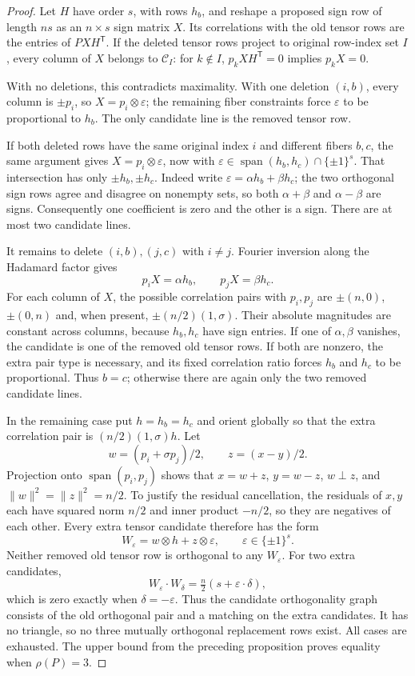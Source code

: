 \begin{proof}
Let $H$ have order $s$, with rows $h_b$, and reshape a proposed sign
row of length $ns$ as an $n\times s$ sign matrix $X$. Its correlations
with the old tensor rows are the entries of $PXH^{\mathsf T}$.
If the deleted tensor rows project to original row-index set $I$,
every column of $X$ belongs to $\mathcal C_I$: for $k\notin I$,
$p_kXH^{\mathsf T}=0$ implies $p_kX=0$.

With no deletions, this contradicts maximality. With one deletion
$(i,b)$, every column is $\pm p_i$, so $X=p_i\otimes\varepsilon$;
the remaining fiber constraints force $\varepsilon$ to be proportional
to $h_b$. The only candidate line is the removed tensor row.

If both deleted rows have the same original index $i$ and different
fibers $b,c$, the same argument gives $X=p_i\otimes\varepsilon$, now
with $\varepsilon\in\operatorname{span}(h_b,h_c)\cap\{\pm1\}^s$.
That intersection has only $\pm h_b,\pm h_c$. Indeed write
$\varepsilon=\alpha h_b+\beta h_c$; the two orthogonal sign rows
agree and disagree on nonempty sets, so both $\alpha+\beta$ and
$\alpha-\beta$ are signs. Consequently one coefficient is zero and
the other is a sign. There are at most two candidate lines.

It remains to delete $(i,b),(j,c)$ with $i\ne j$. Fourier inversion
along the Hadamard factor gives
\[
 p_iX=\alpha h_b,\qquad p_jX=\beta h_c.
\]
For each column of $X$, the possible correlation pairs with $p_i,p_j$
are $\pm(n,0)$, $\pm(0,n)$ and, when present,
$\pm(n/2)(1,\sigma)$. Their absolute magnitudes are constant across
columns, because $h_b,h_c$ have sign entries. If one of $\alpha,\beta$
vanishes, the candidate is one of the removed old tensor rows. If both
are nonzero, the extra pair type is necessary, and its fixed correlation
ratio forces $h_b$ and $h_c$ to be proportional. Thus $b=c$; otherwise
there are again only the two removed candidate lines.

In the remaining case put $h=h_b=h_c$ and orient globally so that the
extra correlation pair is $(n/2)(1,\sigma)h$.
Let
\[
 w=(p_i+\sigma p_j)/2,\qquad z=(x-y)/2.
\]
Projection onto $\operatorname{span}(p_i,p_j)$ shows that
$x=w+z$, $y=w-z$, $w\perp z$, and
$\|w\|^2=\|z\|^2=n/2$. To justify the residual cancellation, the
residuals of $x,y$ each have squared norm $n/2$ and inner product
$-n/2$, so they are negatives of each other. Every extra tensor
candidate therefore has the form
\[
 W_{\varepsilon}=w\otimes h+z\otimes\varepsilon,
 \qquad\varepsilon\in\{\pm1\}^s.
\]
Neither removed old tensor row is orthogonal to any $W_\varepsilon$.
For two extra candidates,
\[
 W_\varepsilon\cdot W_\delta
 =\tfrac n2(s+\varepsilon\cdot\delta),
\]
which is zero exactly when $\delta=-\varepsilon$. Thus the candidate
orthogonality graph consists of the old orthogonal pair and a matching
on the extra candidates. It has no triangle, so no three mutually
orthogonal replacement rows exist. All cases are exhausted.
The upper bound from the preceding proposition proves equality when
$\rho(P)=3$.
\end{proof}

